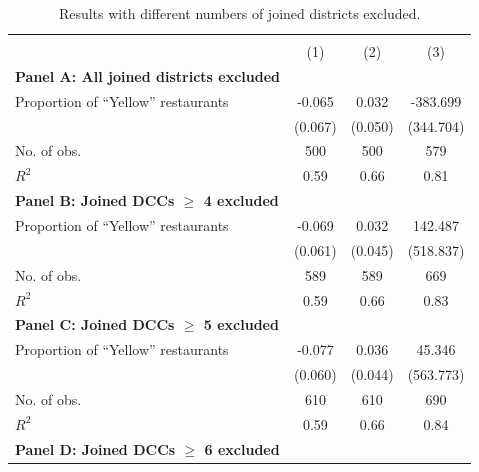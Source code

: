 \documentclass[letterpaper, 12pt]{article}
\begin{document}
\begin{table}[!h]
\centering\begingroup\fontsize{10}{11}\selectfont
\caption{Results with different numbers of joined districts excluded.}
\vspace{6pt}

\begin{tabular}{lccc}
\toprule
{} &  &  &  \\
\cmidrule(l{3pt}r{3pt}){2-2} \cmidrule(l{3pt}r{3pt}){3-3} \cmidrule(l{3pt}r{3pt}){4-4}
 & (1) & (2) & (3)\\
\midrule
\textbf{Panel A: All joined districts excluded} & \phantom{} & \phantom{} & \phantom{}\\

Proportion of ``Yellow'' restaurants & -0.065 & 0.032 & -383.699\\
 & (0.067) & (0.050) & (344.704)\\
No. of obs. & 500 & 500 & 579\\
$R^2$ & 0.59 & 0.66 & 0.81\\
\midrule
\textbf{Panel B: Joined DCCs $\geq$ 4 excluded} & \phantom{} & \phantom{} & \phantom{}\\

Proportion of ``Yellow'' restaurants & -0.069 & 0.032 & 142.487\\
 & (0.061) & (0.045) & (518.837)\\
No. of obs. & 589 & 589 & 669\\
$R^2$ & 0.59 & 0.66 & 0.83\\
\midrule
\textbf{Panel C: Joined DCCs $\geq$ 5 excluded} & \phantom{} & \phantom{} & \phantom{}\\

Proportion of ``Yellow'' restaurants & -0.077 & 0.036 & 45.346\\
 & (0.060) & (0.044) & (563.773)\\
No. of obs. & 610 & 610 & 690\\
$R^2$ & 0.59 & 0.66 & 0.84\\
\midrule
\textbf{Panel D: Joined DCCs $\geq$ 6 excluded} & \phantom{} & \phantom{} & \phantom{}\\


\end{tabular}
\end{table}
\end{document}
